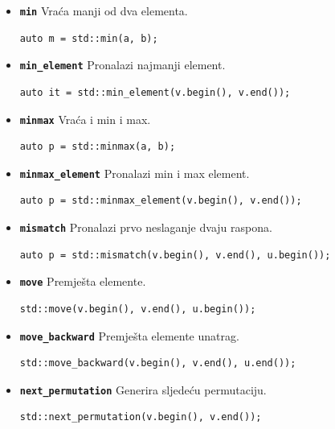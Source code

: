 \begin{itemize}
\item \textbf{\texttt{min}}\newline
Vraća manji od dva elementa.
\begin{verbatim}
auto m = std::min(a, b);
\end{verbatim}

\item \textbf{\texttt{min\_element}}\newline
Pronalazi najmanji element.
\begin{verbatim}
auto it = std::min_element(v.begin(), v.end());
\end{verbatim}

\item \textbf{\texttt{minmax}}\newline
Vraća i min i max.
\begin{verbatim}
auto p = std::minmax(a, b);
\end{verbatim}

\item \textbf{\texttt{minmax\_element}}\newline
Pronalazi min i max element.
\begin{verbatim}
auto p = std::minmax_element(v.begin(), v.end());
\end{verbatim}

\item \textbf{\texttt{mismatch}}\newline
Pronalazi prvo neslaganje dvaju raspona.
\begin{verbatim}
auto p = std::mismatch(v.begin(), v.end(), u.begin());
\end{verbatim}

\item \textbf{\texttt{move}}\newline
Premješta elemente.
\begin{verbatim}
std::move(v.begin(), v.end(), u.begin());
\end{verbatim}

\item \textbf{\texttt{move\_backward}}\newline
Premješta elemente unatrag.
\begin{verbatim}
std::move_backward(v.begin(), v.end(), u.end());
\end{verbatim}

\item \textbf{\texttt{next\_permutation}}\newline
Generira sljedeću permutaciju.
\begin{verbatim}
std::next_permutation(v.begin(), v.end());
\end{verbatim}


\end{itemize}
